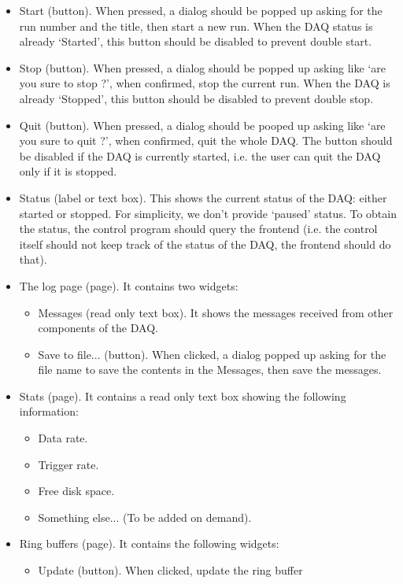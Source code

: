 \documentclass[a4paper,12pt]{article}
\begin{document}
	\begin{itemize}
		\item Start (button). When pressed, a dialog should be popped up
			asking for the run number and the title, then start a new run.
			When the DAQ status is already `Started', this button should be
			disabled to prevent double start.
		\item Stop (button). When pressed, a dialog should be popped up
			asking like `are you sure to stop ?', when confirmed, stop the
			current run.  When the DAQ is already `Stopped', this button
			should be disabled to prevent double stop.
		\item Quit (button). When pressed, a dialog should be pooped up
			asking like `are you sure to quit ?', when confirmed, quit the
			whole DAQ.  The button should be disabled if the DAQ is
			currently started, i.e. the user can quit the DAQ only if it is
			stopped.
		\item Status (label or text box). This shows the current status of
			the DAQ: either started or stopped. For simplicity, we don't
			provide `paused' status. To obtain the status, the control
			program should query the frontend (i.e. the control itself
			should not keep track of the status of the DAQ, the frontend
			should do that).
		\item The log page (page). It contains two widgets:
			\begin{itemize}
				\item Messages (read only text box). It shows the messages
					received from other components of the DAQ.
				\item Save to file... (button). When clicked, a dialog
					popped up asking for the file name to save the contents
					in the Messages, then save the messages.
			\end{itemize}
		\item Stats (page). It contains a read only text box showing the
			following information:
			\begin{itemize}
				\item Data rate.
				\item Trigger rate.
				\item Free disk space.
				\item Something else... (To be added on demand).
			\end{itemize}
		\item Ring buffers (page). It contains the following widgets:
			\begin{itemize}
				\item Update (button). When clicked, update the ring buffer

\end{itemize}
\end{itemize}
\end{document}
